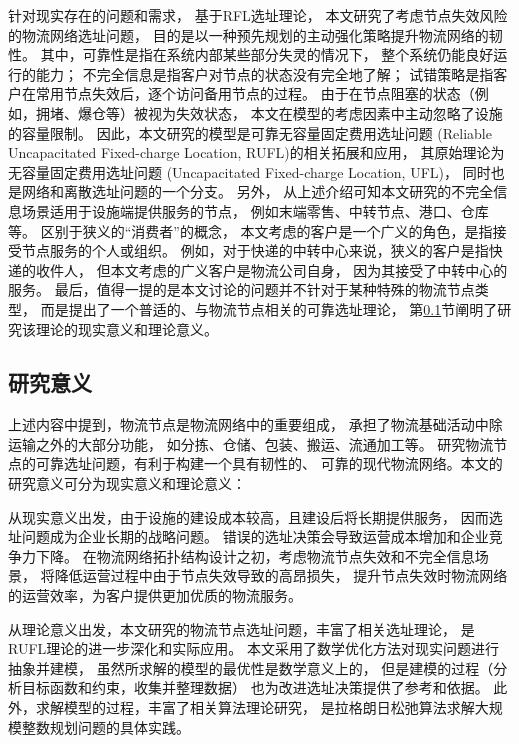针对现实存在的问题和需求，
基于RFL选址理论，
本文研究了考虑节点失效风险的物流网络选址问题，
目的是以一种预先规划的主动强化策略提升物流网络的韧性。
其中，可靠性是指在系统内部某些部分失灵的情况下，
整个系统仍能良好运行的能力\cite{BermanReliability}；
不完全信息是指客户对节点的状态没有完全地了解\cite{BermanIncompleteInformation}；
试错策略是指客户在常用节点失效后，逐个访问备用节点的过程。
由于在节点阻塞的状态（例如，拥堵、爆仓等）被视为失效状态，
本文在模型的考虑因素中主动忽略了设施的容量限制。
因此，本文研究的模型是可靠无容量固定费用选址问题
(Reliable Uncapacitated Fixed-charge Location, RUFL)的相关拓展和应用，
其原始理论为无容量固定费用选址问题
(Uncapacitated Fixed-charge Location, UFL)\cite{Snyder2005}，
同时也是网络和离散选址问题的一个分支\cite{Daskin书}。
另外，
从上述介绍可知本文研究的不完全信息场景适用于设施端提供服务的节点，
例如末端零售、中转节点、港口、仓库等。
区别于狭义的``消费者''的概念，
本文考虑的客户是一个广义的角色，是指接受节点服务的个人或组织。
例如，对于快递的中转中心来说，狭义的客户是指快递的收件人，
但本文考虑的广义客户是物流公司自身，
因为其接受了中转中心的服务。
最后，值得一提的是本文讨论的问题并不针对于某种特殊的物流节点类型，
而是提出了一个普适的、与物流节点相关的可靠选址理论，
第\ref{subsec:研究意义}节阐明了研究该理论的现实意义和理论意义。

\subsection{研究意义}  %
\label{subsec:研究意义}
上述内容中提到，物流节点是物流网络中的重要组成，
承担了物流基础活动中除运输之外的大部分功能，
如分拣、仓储、包装、搬运、流通加工等\cite{董鹏}。
研究物流节点的可靠选址问题，有利于构建一个具有韧性的、
可靠的现代物流网络。本文的研究意义可分为现实意义和理论意义：

从现实意义出发，由于设施的建设成本较高，且建设后将长期提供服务，
因而选址问题成为企业长期的战略问题。
错误的选址决策会导致运营成本增加和企业竞争力下降\cite{Daskin书}。
在物流网络拓扑结构设计之初，考虑物流节点失效和不完全信息场景，
将降低运营过程中由于节点失效导致的高昂损失，
提升节点失效时物流网络的运营效率，为客户提供更加优质的物流服务。

从理论意义出发，本文研究的物流节点选址问题，丰富了相关选址理论，
是RUFL理论的进一步深化和实际应用。
本文采用了数学优化方法对现实问题进行抽象并建模，
虽然所求解的模型的最优性是数学意义上的，
但是建模的过程（分析目标函数和约束，收集并整理数据）
也为改进选址决策提供了参考和依据。
此外，求解模型的过程，丰富了相关算法理论研究，
是拉格朗日松弛算法求解大规模整数规划问题的具体实践。

